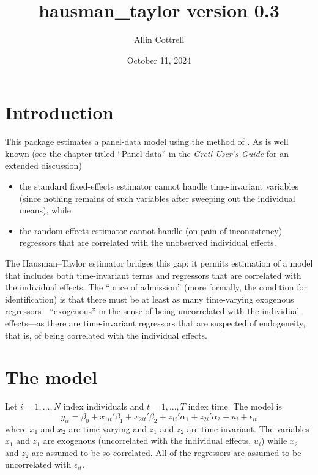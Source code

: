 \documentclass{article}
\begin{document}
\setlength{\parindent}{0pt}
\setlength{\parskip}{1ex}

\newcommand{\argname}[1]{\textsl{#1}}

\title{hausman\_taylor version 0.3}
\author{Allin Cottrell}
\date{October 11, 2024}
\maketitle

\section{Introduction}

This package estimates a panel-data model using the method of
\cite{hausman-taylor81}. As is well known (see the chapter titled
``Panel data'' in the \textit{Gretl User's Guide} for an extended
discussion)
%
\begin{itemize}
\item the standard fixed-effects estimator cannot handle
  time-invariant variables (since nothing remains of such variables
  after sweeping out the individual means), while
\item the random-effects estimator cannot handle (on pain of
  inconsistency) regressors that are correlated with the unobserved
  individual effects.
\end{itemize}

The Hausman--Taylor estimator bridges this gap: it permits estimation
of a model that includes both time-invariant terms and regressors that
are correlated with the individual effects. The ``price of admission''
(more formally, the condition for identification) is that there must
be at least as many time-varying exogenous regressors---``exogenous''
in the sense of being uncorrelated with the individual effects---as 
there are time-invariant regressors that are suspected of endogeneity,
that is, of being correlated with the individual effects.

\section{The model}
\label{sec:model}

Let $i=1,\dots,N$ index individuals and $t=1,\dots,T$ index time. The
model is
\begin{equation}
\label{eq:htmod}
y_{it} = \beta_0 + x_{1it}'\beta_1 + x_{2it}'\beta_2 +
 z_{1i}'\alpha_1 + z_{2i}'\alpha_2 + u_i + \epsilon_{it}
\end{equation}
where $x_1$ and $x_2$ are time-varying and $z_1$ and $z_2$ are
time-invariant. The variables $x_1$ and $z_1$ are exogenous
(uncorrelated with the individual effects, $u_i$) while $x_2$ and
$z_2$ are assumed to be so correlated. All of the regressors are
assumed to be uncorrelated with $\epsilon_{it}$.
\end{document}
